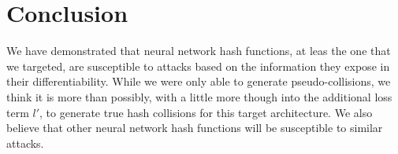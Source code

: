 \documentclass{article}
\begin{document}
\section{Conclusion}
We have demonstrated that neural network hash functions, at leas the one that
we targeted, are susceptible to attacks based on the information they expose in
their differentiability. While we were only able to generate pseudo-collisions,
we think it is more than possibly, with a little more though into the
additional loss term $l'$, to generate true hash collisions for this target
architecture. We also believe that other neural network hash functions will be
susceptible to similar attacks.


 
\end{document}
